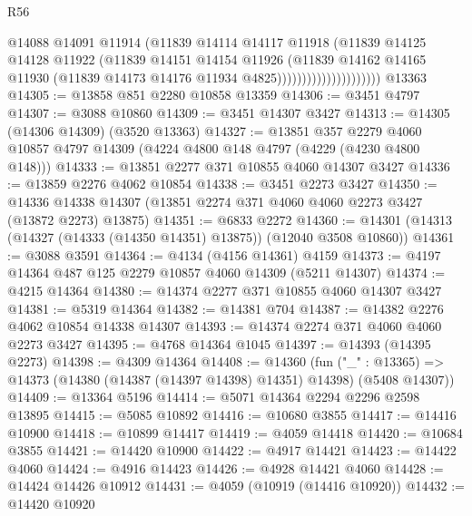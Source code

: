 \begin{lexlean}{R56}
\begin{coremodule}
                                    @14088
                                    @14091
                                    @11914
                                    (@11839
                                      @14114
                                      @14117
                                      @11918
                                      (@11839
                                        @14125
                                        @14128
                                        @11922
                                        (@11839
                                          @14151
                                          @14154
                                          @11926
                                          (@11839
                                            @14162
                                            @14165
                                            @11930
                                            (@11839 @14173 @14176 @11934 @4825)))))))))))))))))))))
    @13363
@14305 := @13858 @851 @2280 @10858 @13359
@14306 := @3451 @4797
@14307 := @3088 @10860
@14309 := @3451 @14307 @3427
@14313 := @14305 (@14306 @14309) (@3520 @13363)
@14327 := @13851
    @357
    @2279
    @4060
    @10857
    @4797
    @14309
    (@4224 @4800 @148 @4797 (@4229 (@4230 @4800 @148)))
@14333 := @13851 @2277 @371 @10855 @4060 @14307 @3427
@14336 := @13859 @2276 @4062 @10854
@14338 := @3451 @2273 @3427
@14350 := @14336 @14338 @14307 (@13851 @2274 @371 @4060 @4060 @2273 @3427 (@13872 @2273) @13875)
@14351 := @6833 @2272
@14360 := @14301 (@14313 (@14327 (@14333 (@14350 @14351) @13875)) (@12040 @3508 @10860))
@14361 := @3088 @3591
@14364 := @4134 (@4156 @14361) @4159
@14373 := @4197 @14364 @487 @125 @2279 @10857 @4060 @14309 (@5211 @14307)
@14374 := @4215 @14364
@14380 := @14374 @2277 @371 @10855 @4060 @14307 @3427
@14381 := @5319 @14364
@14382 := @14381 @704
@14387 := @14382 @2276 @4062 @10854 @14338 @14307
@14393 := @14374 @2274 @371 @4060 @4060 @2273 @3427
@14395 := @4768 @14364 @1045
@14397 := @14393 (@14395 @2273)
@14398 := @4309 @14364
@14408 := @14360
    (fun ("_" : @13365) => @14373 (@14380 (@14387 (@14397 @14398) @14351) @14398) (@5408 @14307))
@14409 := @13364 @5196
@14414 := @5071 @14364 @2294 @2296 @2598 @13895
@14415 := @5085 @10892
@14416 := @10680 @3855
@14417 := @14416 @10900
@14418 := @10899 @14417
@14419 := @4059 @14418
@14420 := @10684 @3855
@14421 := @14420 @10900
@14422 := @4917 @14421
@14423 := @14422 @4060
@14424 := @4916 @14423
@14426 := @4928 @14421 @4060
@14428 := @14424 @14426 @10912
@14431 := @4059 (@10919 (@14416 @10920))
@14432 := @14420 @10920

\end{coremodule}
\end{lexlean}
